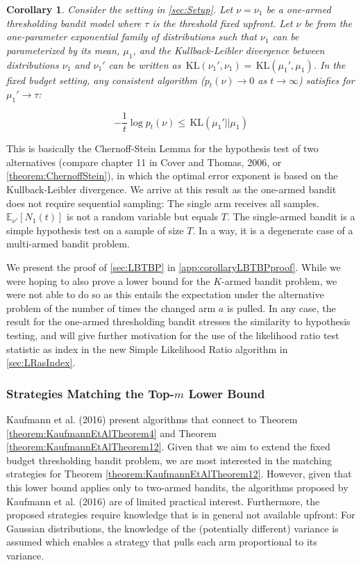 \documentclass[11pt,]{article}
\newtheorem{corollary}{Corollary}
\newcommand{\KL}{\,\text{KL}}
\begin{document}
\begin{corollary}
Consider the setting in \autoref{sec:Setup}. Let $\nu = \nu_1$ be a one-armed thresholding bandit model where $\tau$ is the threshold fixed upfront. Let $\nu$ be from the one-parameter exponential family of distributions such that $\nu_1$ can be parameterized by its mean, $\mu_1$, and the Kullback-Leibler divergence between distributions $\nu_1$ and $\nu_1'$ can be written as $\KL(\nu_1', \nu_1) = \KL(\mu_1', \mu_1)$. In the fixed budget setting, any consistent algorithm ($p_t(\nu) \rightarrow 0$ as $t \rightarrow \infty$) satisfies for $\mu_1' \rightarrow \tau$:

$$
- \frac{1}{t} \log p_t(\nu) \leq \KL(\mu_1' || \mu_1)
$$
\end{corollary}

\label{corollary:LB1TBP}

This is basically the Chernoff-Stein Lemma for the hypothesis test of
two alternatives (compare chapter 11 in Cover and Thomas, 2006, or
\autoref{theorem:ChernoffStein}), in which the optimal error exponent is
based on the Kullback-Leibler divergence. We arrive at this result as
the one-armed bandit does not require sequential sampling: The single
arm receives all samples. \(\mathbb{E}_{\nu'}[N_1(t)]\) is not a random
variable but equals \(T\). The single-armed bandit is a simple
hypothesis test on a sample of size \(T\). In a way, it is a degenerate
case of a multi-armed bandit problem.

We present the proof of \autoref{sec:LBTBP} in
\autoref{app:corollaryLBTBPproof}. While we were hoping to also prove a
lower bound for the \(K\)-armed bandit problem, we were not able to do
so as this entails the expectation under the alternative problem of the
number of times the changed arm \(a\) is pulled. In any case, the result
for the one-armed thresholding bandit stresses the similarity to
hypothesis testing, and will give further motivation for the use of the
likelihood ratio test statistic as index in the new Simple Likelihood
Ratio algorithm in \autoref{sec:LRasIndex}.

\subsubsection{\texorpdfstring{Strategies Matching the Top-\(m\) Lower
Bound}{Strategies Matching the Top-m Lower Bound}}\label{strategies-matching-the-top-m-lower-bound}

Kaufmann et al. (2016) present algorithms that connect to Theorem
\ref{theorem:KaufmannEtAlTheorem4} and Theorem
\ref{theorem:KaufmannEtAlTheorem12}. Given that we aim to extend the
fixed budget thresholding bandit problem, we are most interested in the
matching strategies for Theorem \ref{theorem:KaufmannEtAlTheorem12}.
However, given that this lower bound applies only to two-armed bandits,
the algorithms proposed by Kaufmann et al. (2016) are of limited
practical interest. Furthermore, the proposed strategies require
knowledge that is in general not available upfront: For Gaussian
distributions, the knowledge of the (potentially different) variance is
assumed which enables a strategy that pulls each arm proportional to its
variance.
\end{document}
